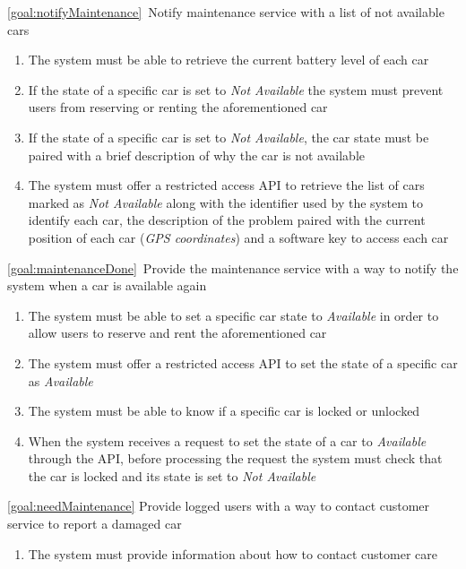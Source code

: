 \begin{description}
		\item \ref{goal:notifyMaintenance}\ Notify maintenance service with a list of not available
		cars
			\begin{enumerate}[resume*]
   				\item The system must be able to retrieve the current battery level of
   				each car
   				\item If the state of a specific car is set to \emph{Not Available} the
   				system must prevent users from reserving or renting the aforementioned car
   				\item If the state of a specific car is set to \emph{Not Available}, the
   				car state must be paired with a brief description of why the car is not
   				available
   				\item The system must offer a restricted access API to retrieve the list of cars marked
   				as \emph{Not Available} along with the identifier used by the system to identify each
   				car, the description of the problem paired with the current position of each car
   				(\emph{GPS coordinates}) and a software key to access each car
  			\end{enumerate}
		\item \ref{goal:maintenanceDone}\ Provide the maintenance service with a way to notify the system when a car is available again
			\begin{enumerate}[resume*]
   				\item The system must be able to set a specific car state to \emph{Available} in order 
   				to allow users to reserve and rent the aforementioned car
   				\item The system must offer a restricted access API to set the state of a
   				specific car as \emph{Available}
   				\item The system must be able to know if a specific car is locked or unlocked
   				\item When the system receives a request to set the state of a car to
   				\emph{Available} through the API, before processing the request the system must
   				check that the car is locked and its state is set to \emph{Not Available}
  			\end{enumerate}
  		\item \ref{goal:needMaintenance} Provide logged users with a way to contact customer service to report a damaged car
  		\begin{enumerate}[resume*]
  			\item The system must provide information about how to contact customer care

\end{enumerate}
\end{description}
